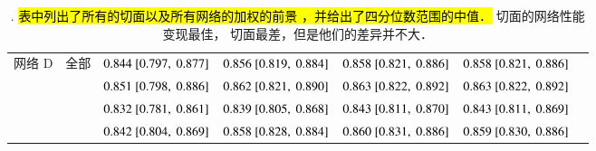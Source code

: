\begin{sidewaystable*}
\begin{center}
\begin{tabular}{ccccccc}
\midrule
网络 D & 全部    & $0.844~[0.797,~0.877]$ & $0.856~[0.819,~0.884]$ & $0.858~[0.821,~0.886]$ & $0.858~[0.821,~0.886]$ \\
          & \SA{}  & $0.851~[0.798,~0.886]$ & $0.862~[0.821,~0.890]$ & $0.863~[0.822,~0.892]$ & $0.863~[0.822,~0.892]$ \\
          & \HLA{} & $0.832~[0.781,~0.861]$ & $0.839~[0.805,~0.868]$ & $0.843~[0.811,~0.870]$ & $0.843~[0.811,~0.869]$ \\
          & \VLA{} & $0.842~[0.804,~0.869]$ & $0.858~[0.828,~0.884]$ & $0.860~[0.831,~0.886]$ & $0.859~[0.830,~0.886]$ \\
\bottomrule
\end{tabular}
\caption[\captiontitle{}]{\captiontitle{}.
\hl{
表中列出了所有的切面以及所有网络的加权的前景 \IoU{}，并给出了四分位数范围的中值．
}
\SA{} 切面的网络性能变现最佳，\HLA{} 切面最差，但是他们的差异并不大．
}
\label{tab:architectureaccuracy}
\end{center}
\end{sidewaystable*}
